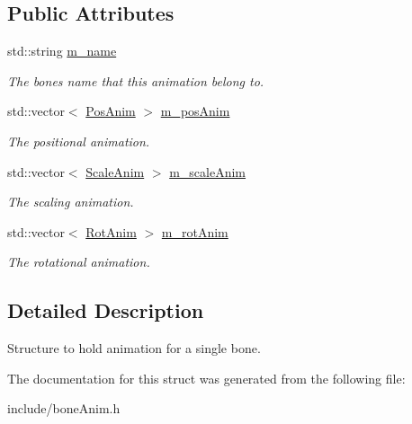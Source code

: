 \subsection*{Public Attributes}
\begin{DoxyCompactItemize}
\item 
std\+::string \hyperlink{structBoneAnim_aa9544d0fb5fee3778cb44c57056d8319}{m\+\_\+name}\hypertarget{structBoneAnim_aa9544d0fb5fee3778cb44c57056d8319}{}\label{structBoneAnim_aa9544d0fb5fee3778cb44c57056d8319}

\begin{DoxyCompactList}\small\item\em The bones name that this animation belong to. \end{DoxyCompactList}\item 
std\+::vector$<$ \hyperlink{structPosAnim}{Pos\+Anim} $>$ \hyperlink{structBoneAnim_ace7f3492a1e772ac72b93d8caaa106c3}{m\+\_\+pos\+Anim}\hypertarget{structBoneAnim_ace7f3492a1e772ac72b93d8caaa106c3}{}\label{structBoneAnim_ace7f3492a1e772ac72b93d8caaa106c3}

\begin{DoxyCompactList}\small\item\em The positional animation. \end{DoxyCompactList}\item 
std\+::vector$<$ \hyperlink{structScaleAnim}{Scale\+Anim} $>$ \hyperlink{structBoneAnim_a4ac9a5f4411f0920a4fb142367a65608}{m\+\_\+scale\+Anim}\hypertarget{structBoneAnim_a4ac9a5f4411f0920a4fb142367a65608}{}\label{structBoneAnim_a4ac9a5f4411f0920a4fb142367a65608}

\begin{DoxyCompactList}\small\item\em The scaling animation. \end{DoxyCompactList}\item 
std\+::vector$<$ \hyperlink{structRotAnim}{Rot\+Anim} $>$ \hyperlink{structBoneAnim_aac216783cc7cd97adc80d52db2d9cd14}{m\+\_\+rot\+Anim}\hypertarget{structBoneAnim_aac216783cc7cd97adc80d52db2d9cd14}{}\label{structBoneAnim_aac216783cc7cd97adc80d52db2d9cd14}

\begin{DoxyCompactList}\small\item\em The rotational animation. \end{DoxyCompactList}\end{DoxyCompactItemize}


\subsection{Detailed Description}
Structure to hold animation for a single bone. 

The documentation for this struct was generated from the following file\+:\begin{DoxyCompactItemize}
\item 
include/bone\+Anim.\+h\end{DoxyCompactItemize}
